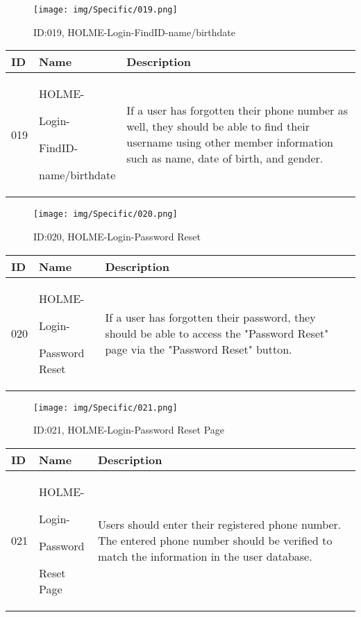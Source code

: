 \documentclass[conference]{IEEEtran}
\begin{document}
\begin{enumerate}
\begin{figure}[h]
\centering
\texttt{[image: img/Specific/019.png]}
\caption{ID:019, HOLME-Login-FindID-name/birthdate}
\end{figure}
\begin{table}[h]
\def\arraystretch{1.2} \small
    \begin{tabular}{|p{1cm}|p{1.8cm}|p{5.0cm}|}
        \hline
        ID & Name & Description\\ \hline
         019 \par  & HOLME-\par Login-\par FindID- \par name/birthdate &If a user has forgotten their phone number as well, they should be able to find their username using other member information such as name, date of birth, and gender.\\ \hline
    \end{tabular}
\end{table}

\begin{figure}[h]
\centering
\texttt{[image: img/Specific/020.png]}
\caption{ID:020, HOLME-Login-Password Reset}
\end{figure}
\begin{table}[h]
\def\arraystretch{1.2} \small
    \begin{tabular}{|p{1cm}|p{1.8cm}|p{5.0cm}|}
        \hline
        ID & Name & Description\\ \hline
         020 \par  & HOLME-\par Login-\par Password Reset &If a user has forgotten their password, they should be able to access the "Password Reset" page via the "Password Reset" button.\\ \hline
    \end{tabular}
\end{table}

\begin{figure}[h]
\centering
\texttt{[image: img/Specific/021.png]}
\caption{ID:021, HOLME-Login-Password Reset Page}
\end{figure}
\begin{table}[h]
\def\arraystretch{1.2} \small
    \begin{tabular}{|p{1cm}|p{1.8cm}|p{5.0cm}|}
        \hline
        ID & Name & Description\\ \hline
         021 \par  & HOLME-\par Login-\par Password \par Reset Page &Users should enter their registered phone number. The entered phone number should be verified to match the information in the user database.\\ \hline
    \end{tabular}
\end{table}
\clearpage


\end{enumerate}
\end{document}
